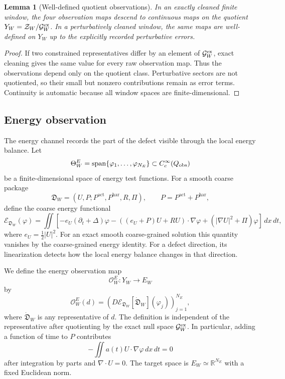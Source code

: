 \documentclass[11pt]{article}
\numberwithin{equation}{section}
\theoremstyle{plain}
\newtheorem{lemma}[theorem]{Lemma}
\theoremstyle{definition}
\theoremstyle{remark}
\newcommand{\R}{\mathbb R}
\newcommand{\har}{\mathrm{har}}
\newcommand{\dxdt}{\,dx\,dt}
\newcommand{\calG}{\mathcal G}
\newcommand{\calO}{\mathcal O}
\newcommand{\calZ}{\mathcal Z}
\newcommand{\frakD}{\mathfrak D}
\newcommand{\act}{\mathrm{act}}
\begin{document}
\begin{lemma}[Well-defined quotient observations]
\label{lem:quotient-observations-well-defined}
In an exactly cleaned finite window, the four observation maps descend to continuous maps on the quotient \(Y_W=\calZ_W/\calG_W^{\rm ex}\).  In a perturbatively cleaned window, the same maps are well-defined on \(Y_W\) up to the explicitly recorded perturbative errors.
\end{lemma}

\begin{proof}
If two constrained representatives differ by an element of \(\calG_W^{\rm ex}\), exact cleaning gives the same value for every raw observation map.  Thus the observations depend only on the quotient class.  Perturbative sectors are not quotiented, so their small but nonzero contributions remain as error terms.  Continuity is automatic because all window spaces are finite-dimensional.
\end{proof}
\subsection{Energy observation}

The energy channel records the part of the defect visible through the local energy balance.  Let
\[
  \Theta_W^E=\operatorname{span}\{\varphi_1,\ldots,\varphi_{N_E}\}
  \subset C_c^\infty(Q_{\rm obs})
\]
be a finite-dimensional space of energy test functions.  For a smooth coarse package
\[
  \frakD_W=(U,P;P^{\act},P^{\har},R,\Pi),
  \qquad P=P^{\act}+P^{\har},
\]
define the coarse energy functional
\[
  \mathscr E_{\frakD_W}(\varphi)
  =
  \iint
  \left[
    -e_U(\partial_t+\Delta)\varphi
    -\left((e_U+P)U+RU\right)\cdot\nabla\varphi
    +\left(|\nabla U|^2+\Pi\right)\varphi
  \right]\,dx\,dt,
\]
where \(e_U=\frac12|U|^2\).  For an exact smooth coarse-grained solution this quantity vanishes by the coarse-grained energy identity.  For a defect direction, its linearization detects how the local energy balance changes in that direction.

We define the energy observation map
\[
  \calO_W^E:Y_W\longrightarrow E_W
\]
by
\begin{equation}
  \calO_W^E(d)
  =
  \left(
  D\mathscr E_{\frakD_W}[\dot{\frakD}_W](\varphi_j)
  \right)_{j=1}^{N_E},
  \label{eq:energy-observation}
\end{equation}
where \(\dot{\frakD}_W\) is any representative of \(d\).  The definition is independent of the representative after quotienting by the exact null space \(\calG_W^{\rm ex}\).  In particular, adding a function of time to \(P\) contributes
\[
  -\iint a(t)U\cdot\nabla\varphi\dxdt=0
\]
after integration by parts and \(\nabla\cdot U=0\).  The target space is \(E_W\simeq\R^{N_E}\) with a fixed Euclidean norm.
\end{document}
